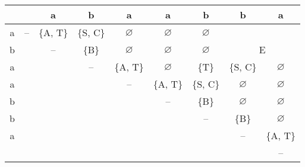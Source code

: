 \documentclass[russian,table]{article}
\begin{document}
\begin{table}[h]
\centering
\begin{tabular}{c|cccccccc}
 &  & a & b & a & a & b & b & a \\ \hline
a & \cellcolor[HTML]{00FF00}-- & \cellcolor[HTML]{00FF00}\{A, T\} & \cellcolor[HTML]{009901}\{S, C\} & \cellcolor[HTML]{009901}$\varnothing$ & \cellcolor[HTML]{FD6864}$\varnothing$ & \cellcolor[HTML]{FD6864}$\varnothing$ & \multicolumn{2}{c}{\cellcolor[HTML]{FD6864}} \\
b &  & \cellcolor[HTML]{00FF00}-- & \cellcolor[HTML]{009901}\{B\} & \cellcolor[HTML]{009901}$\varnothing$ & \cellcolor[HTML]{FD6864}$\varnothing$ & \cellcolor[HTML]{FD6864}$\varnothing$ & \multicolumn{2}{c}{\multirow{-2}{*}{\cellcolor[HTML]{FD6864}E}} \\
a &  &  & \cellcolor[HTML]{00FF00}-- & \cellcolor[HTML]{00FF00}\{A, T\} & \cellcolor[HTML]{FD6864}$\varnothing$ & \cellcolor[HTML]{FD6864}\{T\} & \cellcolor[HTML]{CB0000}\{S, C\} & \cellcolor[HTML]{CB0000}$\varnothing$ \\
a &  &  &  & \cellcolor[HTML]{00FF00}-- & \cellcolor[HTML]{FD6864}\{A, T\} & \cellcolor[HTML]{FD6864}\{S, C\} & \cellcolor[HTML]{CB0000}$\varnothing$ & \cellcolor[HTML]{CB0000}$\varnothing$ \\
b &  &  &  &  & \cellcolor[HTML]{00FF00}-- & \cellcolor[HTML]{00FF00}\{B\} & \cellcolor[HTML]{009901}$\varnothing$ & \cellcolor[HTML]{009901}$\varnothing$ \\
b &  &  &  &  &  & \cellcolor[HTML]{00FF00}-- & \cellcolor[HTML]{009901}\{B\} & \cellcolor[HTML]{009901}$\varnothing$ \\
a &  &  &  &  &  &  & \cellcolor[HTML]{00FF00}-- & \cellcolor[HTML]{00FF00}\{A, T\} \\
 &  &  &  &  &  &  &  & \cellcolor[HTML]{00FF00}--
\end{tabular}
\end{table}
\end{document}
